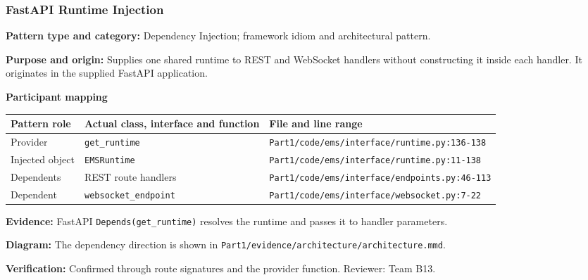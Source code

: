 \documentclass[11pt,a4paper]{article}
\newcommand{\entry}[2]{\textbf{#1:} #2\par}
\newcommand{\codepath}[1]{\nolinkurl{#1}}
\begin{document}
\subsubsection{FastAPI Runtime Injection}
\entry{Pattern type and category}{Dependency Injection; framework idiom and architectural pattern.}
\entry{Purpose and origin}{Supplies one shared runtime to REST and WebSocket handlers without constructing it inside each handler. It originates in the supplied FastAPI application.}
\textbf{Participant mapping}\par
\begin{tabularx}{\linewidth}{@{}lXX@{}}
\toprule
Pattern role & Actual class, interface and function & File and line range\\
\midrule
Provider & \codepath{get_runtime} & \codepath{Part1/code/ems/interface/runtime.py:136-138}\\
Injected object & \codepath{EMSRuntime} & \codepath{Part1/code/ems/interface/runtime.py:11-138}\\
Dependents & REST route handlers & \codepath{Part1/code/ems/interface/endpoints.py:46-113}\\
Dependent & \codepath{websocket_endpoint} & \codepath{Part1/code/ems/interface/websocket.py:7-22}\\
\bottomrule
\end{tabularx}
\entry{Evidence}{FastAPI \codepath{Depends(get_runtime)} resolves the runtime and passes it to handler parameters.}
\entry{Diagram}{The dependency direction is shown in \codepath{Part1/evidence/architecture/architecture.mmd}.}
\entry{Verification}{Confirmed through route signatures and the provider function. Reviewer: Team B13.}
\end{document}
